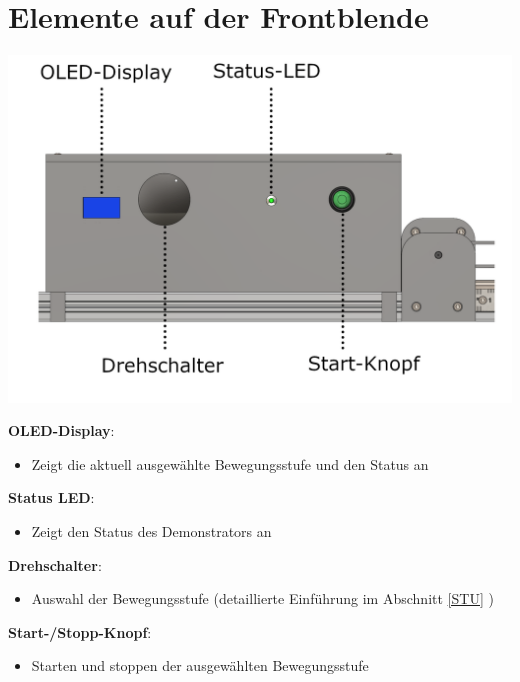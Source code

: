 %
%

\chapter{Elemente auf der Frontblende}
\begin{center}
	
	\includegraphics[width=\textwidth]{Images/Konstruktion2.png}
	
	\label{Frontblende}
\end{center}

	\textbf{OLED-Display}: 
\begin{itemize}
	\item Zeigt die aktuell ausgewählte Bewegungsstufe und den Status an
\end{itemize}

	\textbf{Status LED}: 
\begin{itemize}
	\item Zeigt den Status des Demonstrators an
\end{itemize}

	\textbf{Drehschalter}: 
\begin{itemize}
	\item Auswahl der Bewegungsstufe (detaillierte Einführung im Abschnitt \ref{STU} )
\end{itemize}

	\textbf{Start-/Stopp-Knopf}: 
\begin{itemize}
	\item Starten und stoppen der ausgewählten Bewegungsstufe
\end{itemize}
